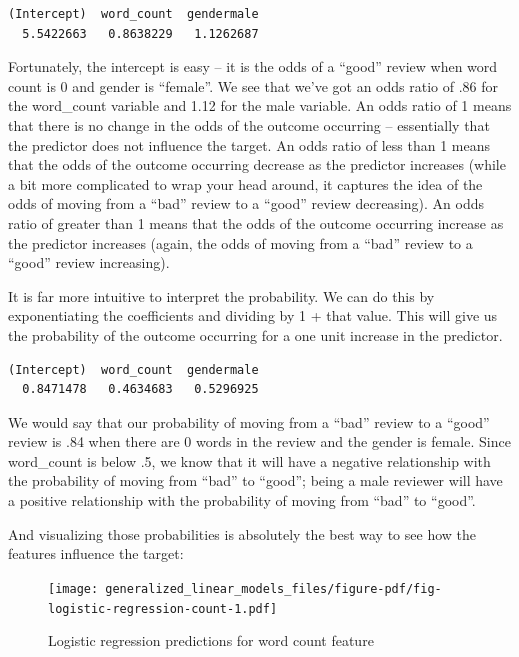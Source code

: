 \documentclass[
  letterpaper,
]{krantz}
\begin{document}
\begin{verbatim}
(Intercept)  word_count  gendermale 
  5.5422663   0.8638229   1.1262687 
\end{verbatim}

Fortunately, the intercept is easy -- it is the odds of a ``good''
review when word count is 0 and gender is ``female''. We see that we've
got an odds ratio of .86 for the word\_count variable and 1.12 for the
male variable. An odds ratio of 1 means that there is no change in the
odds of the outcome occurring -- essentially that the predictor does not
influence the target. An odds ratio of less than 1 means that the odds
of the outcome occurring decrease as the predictor increases (while a
bit more complicated to wrap your head around, it captures the idea of
the odds of moving from a ``bad'' review to a ``good'' review
decreasing). An odds ratio of greater than 1 means that the odds of the
outcome occurring increase as the predictor increases (again, the odds
of moving from a ``bad'' review to a ``good'' review increasing).

It is far more intuitive to interpret the probability. We can do this by
exponentiating the coefficients and dividing by 1 + that value. This
will give us the probability of the outcome occurring for a one unit
increase in the predictor.

\begin{verbatim}
(Intercept)  word_count  gendermale 
  0.8471478   0.4634683   0.5296925 
\end{verbatim}

We would say that our probability of moving from a ``bad'' review to a
``good'' review is .84 when there are 0 words in the review and the
gender is female. Since word\_count is below .5, we know that it will
have a negative relationship with the probability of moving from ``bad''
to ``good''; being a male reviewer will have a positive relationship
with the probability of moving from ``bad'' to ``good''.

And visualizing those probabilities is absolutely the best way to see
how the features influence the target:

\begin{figure}

{\centering \texttt{[image: generalized\_linear\_models\_files/figure-pdf/fig-logistic-regression-count-1.pdf]}

}

\caption{\label{fig-logistic-regression-count}Logistic regression
predictions for word count feature}

\end{figure}
\end{document}
